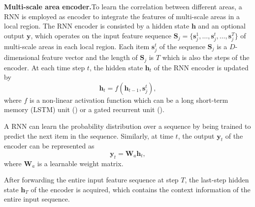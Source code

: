 \documentclass[letterpaper]{article}
\begin{document}
\noindent
\newline
\textbf{Multi-scale area encoder.}\quad To learn the correlation between different areas, a RNN is employed as encoder to integrate the features of multi-scale areas in a local region. The RNN encoder is consisted by a hidden state $\mathbf{h}$ and an optional output $\mathbf{y}$, which operates on the input feature sequence $\bm{S}_j = \lbrace \bm{s}_j^1, \dots, \bm{s}_j^t, \dots, \bm{s}_j^T \rbrace$ of multi-scale areas in each local region. Each item $\bm{s}_j^t$ of the sequence $\bm{S}_j$ is a $D$-dimensional feature vector and the length of $\bm{S}_j$ is $T$ which is also the steps of the encoder.  
At each time step $t$, the hidden state $\mathbf{h}_{t}$ of the RNN encoder is updated by
\begin{equation}
\mathbf{h}_{t} = f(\mathbf{h}_{t-1}, \bm{s}_j^t),
\label{equal:eh}
\end{equation}
where $f$ is a non-linear activation function which can be a long short-term memory (LSTM) unit (\citealt{hochreiter1997long}) or a gated recurrent unit (\citealt{cho2014learning}).

A RNN can learn the probability distribution over a sequence by being trained to predict the next item in the sequence.
Similarly, at time $t$, the output $\mathbf{y}_t$ of the encoder can be represented as
\begin{equation}
\mathbf{y}_{t} = \mathbf{W}_a\mathbf{h}_t,
\label{equal:ey}
\end{equation}
where $\mathbf{W}_a$ is a learnable weight matrix. 

After forwarding the entire input feature sequence at step $T$, the last-step  hidden state $\mathbf{h}_T$ of the encoder is acquired, which contains the context information of the entire input sequence.
\end{document}
